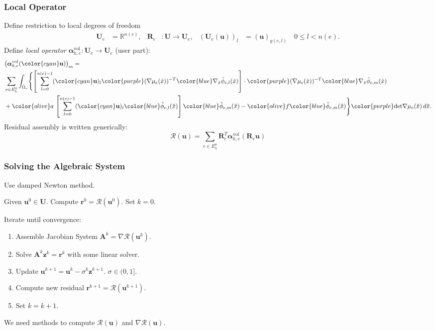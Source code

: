 \begin{frame}
\frametitle{Local Operator}
Define restriction to local degrees of freedom
\begin{align*}
\mathbf{U}_e &= \mathbb{R}^{n(e)}, &
\mathbf{R}_e &: \mathbf{U} \to \mathbf{U}_e, &
\left(\mathbf{U}_e(\mathbf{u})\right)_l &= (\mathbf{u})_{g(e,l)} \quad 0\leq l < n(e).
\end{align*}
Define \textit{local operator} $\bm{\alpha}^{\text{vol}}_{h,e} : \mathbf{U}_e \to \mathbf{U}_e$ (user part):
\begin{equation*}
\begin{split}
&\bigl(\bm{\alpha}^{\text{vol}}_{h,e}({\color{cyan}\mathbf{u}})\bigr)_m  = \\
&\sum_{e\in E_h^0} \int_{\hat\Omega_e} 
\Biggl\{\left[ \sum_{l=0}^{n(e)-1} ({\color{cyan}\mathbf{u}})_{l} {\color{purple}
(\nabla \mu_e(\hat{x}))^{-T}} {\color{blue}\nabla_{\hat{x}} \hat\phi_{e,l}(\hat{x})} \right]
\cdot {\color{purple}(\nabla \mu_e(\hat{x}))^{-T}} {\color{blue}\nabla_{\hat{x}} \hat\phi_{e,m}(\hat{x})}\\
& + {\color{olive} a} \, \left[ \sum_{l=0}^{n(e)-1} ({\color{cyan}\mathbf{u}})_{l}
 {\color{blue}\hat\phi_{e,l}(\hat{x})} \right] {\color{blue}\hat\phi_{e,m}(\hat{x})}
- {\color{olive} f} {\color{blue}\hat\phi_{e,m}(\hat{x})} \Biggr\} {\color{purple}\text{det} \nabla\mu_e(\hat{x})} \, d\hat{x} .
\end{split}
\end{equation*}
Residual assembly is written generically:
\begin{equation*}
\mathcal{R}(\mathbf{u}) = \sum_{e\in E_h^0} \mathbf{R}_e^T \bm{\alpha}^{\text{vol}}_{h,e} (\mathbf{R}_e \mathbf{u})
\end{equation*}
\end{frame}


\begin{frame}
\frametitle{Solving the Algebraic System}
Use damped Newton method.

Given $\mathbf{u}^0\in\mathbf{U}$. Compute $\mathbf{r}^0 = \mathcal{R}(\mathbf{u}^0)$. Set $k=0$.

Iterate until convergence:
\begin{enumerate}
\item Assemble Jacobian System $\mathbf{A}^k = \nabla\mathcal{R}(\mathbf{u}^k)$.
\item Solve $\mathbf{A}^k \mathbf{z}^k = \mathbf{r}^k$ with some linear solver.
\item Update $\mathbf{u}^{k+1} = \mathbf{u}^{k} - \sigma^k \mathbf{z}^{k+1}$. $\sigma\in(0,1]$.
\item Compute new residual $\mathbf{r}^{k+1} = \mathcal{R}(\mathbf{u}^{k+1})$.
\item Set $k = k +1$.
\end{enumerate}

We need methods to compute $\mathcal{R}(\mathbf{u})$ and $\nabla\mathcal{R}(\mathbf{u})$.
\end{frame}

